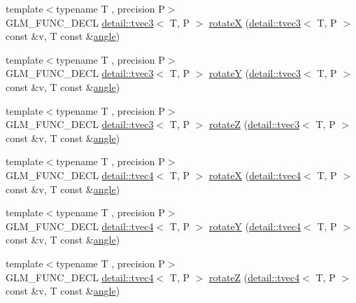 \begin{DoxyCompactItemize}
\item 
{\footnotesize template$<$typename T , precision P$>$ }\\G\+L\+M\+\_\+\+F\+U\+N\+C\+\_\+\+D\+E\+CL \hyperlink{structglm_1_1detail_1_1tvec3}{detail\+::tvec3}$<$ T, P $>$ \hyperlink{group__gtx__rotate__vector_gadb69cdc8ea08715c9d8a74f587cf0eac}{rotateX} (\hyperlink{structglm_1_1detail_1_1tvec3}{detail\+::tvec3}$<$ T, P $>$ const \&v, T const \&\hyperlink{group__gtc__quaternion_ga23a3fc7ada5bbb665ff84c92c6e0542c}{angle})
\item 
{\footnotesize template$<$typename T , precision P$>$ }\\G\+L\+M\+\_\+\+F\+U\+N\+C\+\_\+\+D\+E\+CL \hyperlink{structglm_1_1detail_1_1tvec3}{detail\+::tvec3}$<$ T, P $>$ \hyperlink{group__gtx__rotate__vector_gae1e673b7a464218ce6a5e8f02145f877}{rotateY} (\hyperlink{structglm_1_1detail_1_1tvec3}{detail\+::tvec3}$<$ T, P $>$ const \&v, T const \&\hyperlink{group__gtc__quaternion_ga23a3fc7ada5bbb665ff84c92c6e0542c}{angle})
\item 
{\footnotesize template$<$typename T , precision P$>$ }\\G\+L\+M\+\_\+\+F\+U\+N\+C\+\_\+\+D\+E\+CL \hyperlink{structglm_1_1detail_1_1tvec3}{detail\+::tvec3}$<$ T, P $>$ \hyperlink{group__gtx__rotate__vector_gae5c27548f86f1e95f76a87cf16f512da}{rotateZ} (\hyperlink{structglm_1_1detail_1_1tvec3}{detail\+::tvec3}$<$ T, P $>$ const \&v, T const \&\hyperlink{group__gtc__quaternion_ga23a3fc7ada5bbb665ff84c92c6e0542c}{angle})
\item 
{\footnotesize template$<$typename T , precision P$>$ }\\G\+L\+M\+\_\+\+F\+U\+N\+C\+\_\+\+D\+E\+CL \hyperlink{structglm_1_1detail_1_1tvec4}{detail\+::tvec4}$<$ T, P $>$ \hyperlink{group__gtx__rotate__vector_gaa0db2d8b73f86d7bfdf2bface4056e88}{rotateX} (\hyperlink{structglm_1_1detail_1_1tvec4}{detail\+::tvec4}$<$ T, P $>$ const \&v, T const \&\hyperlink{group__gtc__quaternion_ga23a3fc7ada5bbb665ff84c92c6e0542c}{angle})
\item 
{\footnotesize template$<$typename T , precision P$>$ }\\G\+L\+M\+\_\+\+F\+U\+N\+C\+\_\+\+D\+E\+CL \hyperlink{structglm_1_1detail_1_1tvec4}{detail\+::tvec4}$<$ T, P $>$ \hyperlink{group__gtx__rotate__vector_gae48a26ac0e3670ad2486858bf2a8e90b}{rotateY} (\hyperlink{structglm_1_1detail_1_1tvec4}{detail\+::tvec4}$<$ T, P $>$ const \&v, T const \&\hyperlink{group__gtc__quaternion_ga23a3fc7ada5bbb665ff84c92c6e0542c}{angle})
\item 
{\footnotesize template$<$typename T , precision P$>$ }\\G\+L\+M\+\_\+\+F\+U\+N\+C\+\_\+\+D\+E\+CL \hyperlink{structglm_1_1detail_1_1tvec4}{detail\+::tvec4}$<$ T, P $>$ \hyperlink{group__gtx__rotate__vector_ga1db5137be16ed5d375038e06707ac52b}{rotateZ} (\hyperlink{structglm_1_1detail_1_1tvec4}{detail\+::tvec4}$<$ T, P $>$ const \&v, T const \&\hyperlink{group__gtc__quaternion_ga23a3fc7ada5bbb665ff84c92c6e0542c}{angle})

\end{DoxyCompactItemize}

